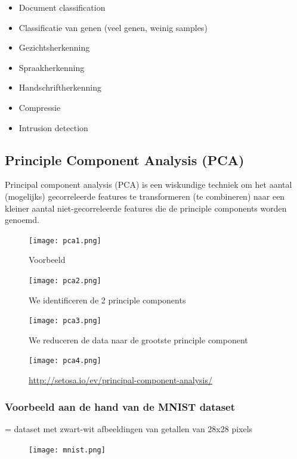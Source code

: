 \documentclass{article}
\begin{document}
\begin{itemize}
    \item Document classification
    \item Classificatie van genen (veel genen, weinig samples)
    \item Gezichtsherkenning
    \item Spraakherkenning
    \item Handschriftherkenning
    \item Compressie
    \item Intrusion detection
\end{itemize}

\subsection{Principle Component Analysis (PCA)}

Principal component analysis (PCA) is een wiskundige techniek om het aantal (mogelijks)
gecorreleerde features te transformeren (te combineren) naar een kleiner aantal niet-gecorreleerde features
die de principle components worden genoemd.

\begin{figure}[H]
    \centering
    \texttt{[image: pca1.png]}
    \caption{Voorbeeld}
\end{figure}

\begin{figure}[H]
    \centering
    \texttt{[image: pca2.png]}
    \caption{We identificeren de 2 principle components}
\end{figure}

\begin{figure}[H]
    \centering
    \texttt{[image: pca3.png]}
    \caption{We reduceren de data naar de grootste principle component}
\end{figure}

\begin{figure}[H]
    \centering
    \texttt{[image: pca4.png]}
    \caption{\url{http://setosa.io/ev/principal-component-analysis/}}
\end{figure}

\subsubsection{Voorbeeld aan de hand van de MNIST dataset}

= dataset met zwart-wit afbeeldingen van getallen van 28x28 pixels

\begin{figure}[H]
    \centering
    \texttt{[image: mnist.png]}
\end{figure}
\end{document}
